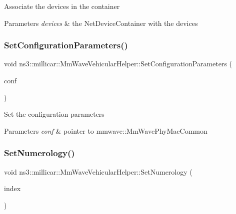 Associate the devices in the container 
\begin{DoxyParams}{Parameters}
{\em devices} & the Net\+Device\+Container with the devices \\
\hline
\end{DoxyParams}
\mbox{\label{classns3_1_1millicar_1_1MmWaveVehicularHelper_a0976a2d0e5f3bce4bc7fb75f67209d8f}} 
\subsubsection{\texorpdfstring{Set\+Configuration\+Parameters()}{SetConfigurationParameters()}}
{\footnotesize\ttfamily void ns3\+::millicar\+::\+Mm\+Wave\+Vehicular\+Helper\+::\+Set\+Configuration\+Parameters (\begin{DoxyParamCaption}\item[{Ptr$<$ mmwave\+::\+Mm\+Wave\+Phy\+Mac\+Common $>$}]{conf }\end{DoxyParamCaption})}

Set the configuration parameters 
\begin{DoxyParams}{Parameters}
{\em conf} & pointer to mmwave\+::\+Mm\+Wave\+Phy\+Mac\+Common \\
\hline
\end{DoxyParams}
\mbox{\label{classns3_1_1millicar_1_1MmWaveVehicularHelper_a8653a3225aa1df7ef17eb9ed3d6ebab9}} 
\subsubsection{\texorpdfstring{Set\+Numerology()}{SetNumerology()}}
{\footnotesize\ttfamily void ns3\+::millicar\+::\+Mm\+Wave\+Vehicular\+Helper\+::\+Set\+Numerology (\begin{DoxyParamCaption}\item[{uint8\+\_\+t}]{index }\end{DoxyParamCaption})}

